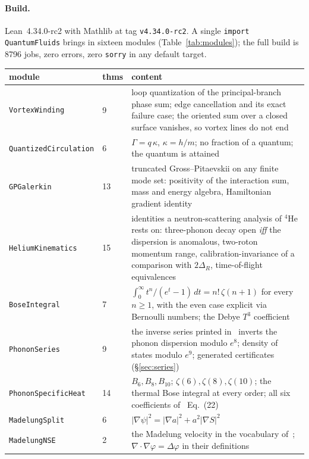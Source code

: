 \documentclass[11pt,a4paper]{article}
\theoremstyle{definition}
\newcommand{\lean}[1]{\texttt{\small #1}}
\begin{document}
\paragraph{Build.} Lean~4.34.0-rc2 with Mathlib at tag \texttt{v4.34.0-rc2}. A single
\lean{import QuantumFluids} brings in sixteen modules (Table~\ref{tab:modules}); the full
build is 8796 jobs, zero errors, zero \lean{sorry} in any default target.

\begin{table}[h]
\centering\small
\begin{tabular}{@{}llp{8.6cm}@{}}
\toprule
module & thms & content \\
\midrule
\lean{VortexWinding} & 9 & loop quantization of the principal-branch phase sum; edge
  cancellation and its exact failure case; the oriented sum over a closed surface vanishes, so
  vortex lines do not end \\
\lean{QuantizedCirculation} & 6 & $\Gamma = q\,\kappa$, $\kappa = h/m$; no fraction of a
  quantum; the quantum is attained \\
\lean{GPGalerkin} & 13 & truncated Gross--Pitaevskii on any finite mode set: positivity of the
  interaction sum, mass and energy algebra, Hamiltonian gradient identity \\
\lean{HeliumKinematics} & 15 & identities a neutron-scattering analysis of $^4$He rests on:
  three-phonon decay open \emph{iff} the dispersion is anomalous, two-roton momentum range,
  calibration-invariance of a comparison with $2\Delta_R$, time-of-flight equivalences \\
\lean{BoseIntegral} & 7 & $\int_0^\infty t^{n}/(e^t-1)\,dt = n!\,\zeta(n+1)$ for every $n \ge 1$,
  with the even case explicit via Bernoulli numbers; the Debye $T^3$ coefficient \\
\lean{PhononSeries} & 9 & the inverse series printed in~\cite{Godfrin2021} inverts the phonon dispersion
  modulo $e^8$; density of states modulo $e^9$; generated certificates (\S\ref{sec:series}) \\
\lean{PhononSpecificHeat} & 14 & $B_6,B_8,B_{10}$; $\zeta(6),\zeta(8),\zeta(10)$; the thermal Bose integral at
  every order; all six coefficients of~\cite{Godfrin2021} Eq.~(22) \\
\lean{MadelungSplit} & 6 & $|\nabla\psi|^2 = |\nabla a|^2 + a^2|\nabla S|^2$ \\
\lean{MadelungNSE} & 2 & the Madelung velocity in the vocabulary of~\cite{OpenAINSE};
  $\nabla\!\cdot\!\nabla\varphi = \Delta\varphi$ in their definitions \\

\end{tabular}
\end{table}
\end{document}
